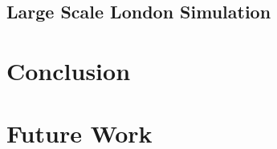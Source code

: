 \documentclass[a4paper,11pt,titlepage]{report}
\begin{document}
\section{Large Scale London Simulation}

\newpage
\chapter{Conclusion}

\newpage
\chapter{Future Work}


\newpage
{}

\printbibliography
\end{document}

